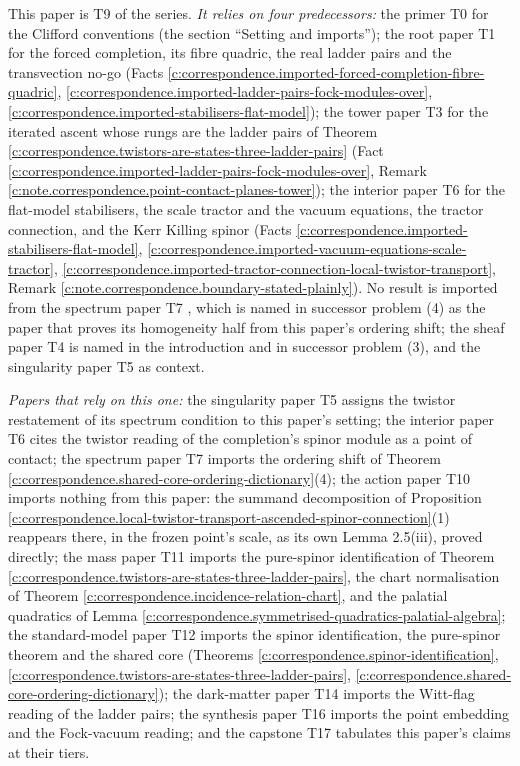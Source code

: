 \documentclass[11pt]{article}
\theoremstyle{definition}
\theoremstyle{plain}
\begin{document}
\label{c:note.correspondence.setting-position-series}
This paper is T9 of the series. \emph{It relies on four predecessors:} the primer T0 \cite{ButlerT0} for the Clifford conventions (the section ``Setting and imports''); the root paper T1 \cite{ButlerT1} for the forced completion, its fibre quadric, the real ladder pairs and the transvection no-go (Facts \ref{c:correspondence.imported-forced-completion-fibre-quadric}, \ref{c:correspondence.imported-ladder-pairs-fock-modules-over}, \ref{c:correspondence.imported-stabilisers-flat-model}); the tower paper T3 \cite{ButlerT3} for the iterated ascent whose rungs are the ladder pairs of Theorem \ref{c:correspondence.twistors-are-states-three-ladder-pairs} (Fact \ref{c:correspondence.imported-ladder-pairs-fock-modules-over}, Remark \ref{c:note.correspondence.point-contact-planes-tower}); the interior paper T6 \cite{ButlerT6} for the flat-model stabilisers, the scale tractor and the vacuum equations, the tractor connection, and the Kerr Killing spinor (Facts \ref{c:correspondence.imported-stabilisers-flat-model}, \ref{c:correspondence.imported-vacuum-equations-scale-tractor}, \ref{c:correspondence.imported-tractor-connection-local-twistor-transport}, Remark \ref{c:note.correspondence.boundary-stated-plainly}). No result is imported from the spectrum paper T7 \cite{ButlerT7}, which is named in successor problem (4) as the paper that proves its homogeneity half from this paper's ordering shift; the sheaf paper T4 \cite{ButlerT4} is named in the introduction and in successor problem (3), and the singularity paper T5 \cite{ButlerT5} as context.

\emph{Papers that rely on this one:} the singularity paper T5 \cite{ButlerT5} assigns the twistor restatement of its spectrum condition to this paper's setting; the interior paper T6 \cite{ButlerT6} cites the twistor reading of the completion's spinor module as a point of contact; the spectrum paper T7 \cite{ButlerT7} imports the ordering shift of Theorem \ref{c:correspondence.shared-core-ordering-dictionary}(4); the action paper T10 \cite{ButlerT10} imports nothing from this paper: the summand decomposition of Proposition \ref{c:correspondence.local-twistor-transport-ascended-spinor-connection}(1) reappears there, in the frozen point's scale, as its own Lemma 2.5(iii), proved directly; the mass paper T11 \cite{ButlerT11} imports the pure-spinor identification of Theorem \ref{c:correspondence.twistors-are-states-three-ladder-pairs}, the chart normalisation of Theorem \ref{c:correspondence.incidence-relation-chart}, and the palatial quadratics of Lemma \ref{c:correspondence.symmetrised-quadratics-palatial-algebra}; the standard-model paper T12 \cite{ButlerT12} imports the spinor identification, the pure-spinor theorem and the shared core (Theorems \ref{c:correspondence.spinor-identification}, \ref{c:correspondence.twistors-are-states-three-ladder-pairs}, \ref{c:correspondence.shared-core-ordering-dictionary}); the dark-matter paper T14 \cite{ButlerT14} imports the Witt-flag reading of the ladder pairs; the synthesis paper T16 \cite{ButlerT16} imports the point embedding and the Fock-vacuum reading; and the capstone T17 \cite{ButlerT17} tabulates this paper's claims at their tiers.
\end{document}
